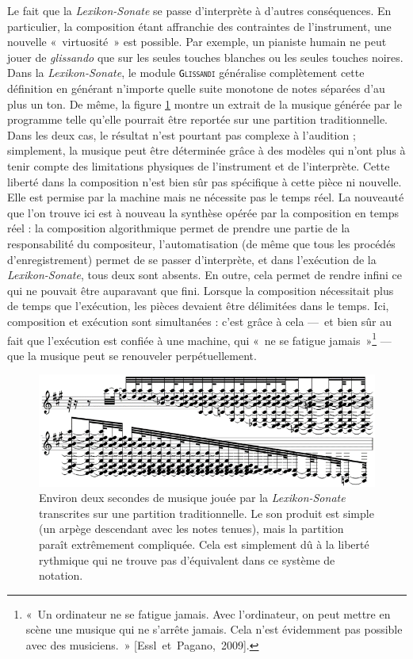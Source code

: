 \documentclass[a4paper,12pt]{article}
\newcommand{\guill}[1]{«~#1~»}
\newcommand{\cicite}[1]{{\footnotesize[#1]}}
\begin{document}
Le fait que la \emph{Lexikon-Sonate} se passe d'interprète à d'autres conséquences. En particulier, la composition étant affranchie des contraintes de l'instrument, une nouvelle \guill{virtuosité} est possible. Par exemple, un pianiste humain ne peut jouer de \emph{glissando} que sur les seules touches blanches ou les seules touches noires. Dans la \emph{Lexikon-Sonate}, le module \texttt{\textsc{Glissandi}} généralise complètement cette définition en générant n'importe quelle suite monotone de notes séparées d'au plus un ton. De même, la figure \ref{partitionls} montre un extrait de la musique générée par le programme telle qu'elle pourrait être reportée sur une partition traditionnelle. Dans les deux cas, le résultat n'est pourtant pas complexe à l'audition ; simplement, la musique peut être déterminée grâce à des modèles qui n'ont plus à tenir compte des limitations physiques de l'instrument et de l'interprète. Cette liberté dans la composition n'est bien sûr pas spécifique à cette pièce ni nouvelle. Elle est permise par la machine mais ne nécessite pas le temps réel. La nouveauté que l'on trouve ici est à nouveau la synthèse opérée par la composition en temps réel : la composition algorithmique permet de prendre une partie de la responsabilité du compositeur, l'automatisation (de même que tous les procédés d'enregistrement) permet de se passer d'interprète, et dans l'exécution de la \emph{Lexikon-Sonate}, tous deux sont absents. En outre, cela permet de rendre infini ce qui ne pouvait être auparavant que fini. Lorsque la composition nécessitait plus de temps que l'exécution, les pièces devaient être délimitées dans le temps. Ici, composition et exécution sont simultanées : c'est grâce à cela ---~et bien sûr au fait que l'exécution est confiée à une machine, qui \guill{ne se fatigue jamais}\footnote{\guill{Un ordinateur ne se fatigue jamais. Avec l'ordinateur, on peut mettre en scène une musique qui ne s'arrête jamais. Cela n'est évidemment pas possible avec des musiciens.} \cicite{Essl~et~Pagano,~2009}.} --- que la musique peut se renouveler perpétuellement.

\begin{figure}[!h]
\begin{center}
\includegraphics[width=12cm]{images/partitionls.png}
\caption{\footnotesize Environ deux secondes de musique jouée par la \emph{Lexikon-Sonate} transcrites sur une partition traditionnelle. Le son produit est simple (un arpège descendant avec les notes tenues), mais la partition paraît extrêmement compliquée. Cela est simplement dû à la liberté rythmique qui ne trouve pas d'équivalent dans ce système de notation.}
\label{partitionls}
\end{center}
\end{figure}
\end{document}

